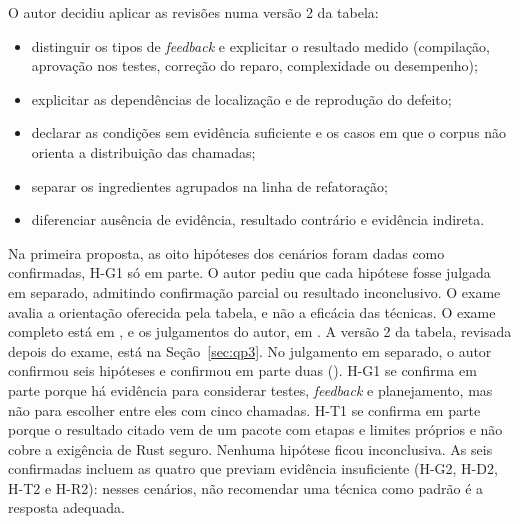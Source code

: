 O autor decidiu aplicar as revisões numa versão 2 da tabela:
\begin{itemize}
  \item distinguir os tipos de \textit{feedback} e explicitar o resultado medido (compilação, aprovação nos testes,
  correção do reparo, complexidade ou desempenho);
  \item explicitar as dependências de localização e de reprodução do defeito;
  \item declarar as condições sem evidência suficiente e os casos em que o corpus não orienta a distribuição das
  chamadas;
  \item separar os ingredientes agrupados na linha de refatoração;
  \item diferenciar ausência de evidência, resultado contrário e evidência indireta.
\end{itemize}
Na primeira proposta, as oito hipóteses dos cenários foram dadas como confirmadas, H-G1 só em parte. O autor pediu
que cada hipótese fosse julgada em separado, admitindo confirmação parcial ou resultado inconclusivo. O exame avalia a
orientação oferecida pela tabela, e não a eficácia das técnicas. O exame completo está em
, e os julgamentos do autor, em
.
A versão 2 da tabela, revisada depois do exame, está na Seção~\ref{sec:qp3}. No julgamento em separado, o autor confirmou seis hipóteses e confirmou em parte duas
(). H-G1 se confirma em parte porque há evidência para
considerar testes, \textit{feedback} e planejamento, mas não para escolher entre eles com cinco chamadas. H-T1 se
confirma em parte porque o resultado citado vem de um pacote com etapas e limites próprios e não cobre a exigência
de Rust seguro. Nenhuma hipótese ficou inconclusiva. As seis confirmadas incluem as quatro que previam evidência
insuficiente (H-G2, H-D2, H-T2 e H-R2): nesses cenários, não recomendar uma técnica como padrão é a resposta
adequada.
